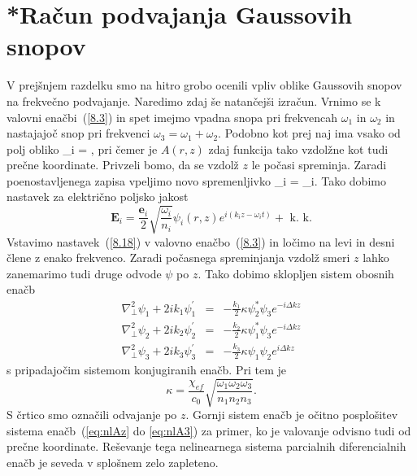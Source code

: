 \section{{*}Račun podvajanja Gaussovih snopov}

V prejšnjem razdelku smo na hitro grobo ocenili vpliv oblike Gaussovih snopov
na frekvečno podvajanje. Naredimo zdaj še natančejši izračun. Vrnimo se k valovni
enačbi~(\ref{8.3}) in spet imejmo vpadna snopa pri frekvencah
$\omega_{1}$ in $\omega_{2}$ in nastajajoč snop pri frekvenci
$\omega_{3}=\omega_{1}+\omega_{2}$.
Podobno kot prej naj ima vsako od polj obliko 
\beq
{}_{i}  = ,
\eeq
pri čemer je $A(r,z)$ zdaj funkcija tako vzdolžne kot tudi prečne koordinate. Privzeli
bomo, da se vzdolž $z$ le počasi spreminja.
Zaradi poenostavljenega zapisa vpeljimo novo spremenljivko 
\beq
\psi_i = _i.
\eeq
Tako dobimo nastavek za električno poljsko jakost
\begin{equation}
\mathbf{E}_{i}=\frac{\mathbf{e}_{i}}{2}\sqrt{\frac{\omega_{i}}{n_{i}}}\psi_{i}(r,z)
e^{i(k_{i}z-\omega_{i}t)}+\mbox{ k. k.}
\label{8.18}
\end{equation}
Vstavimo nastavek~(\ref{8.18}) v valovno
enačbo~(\ref{8.3}) in ločimo na levi in desni člene z enako frekvenco.
Zaradi počasnega spreminjanja vzdolž smeri $z$ lahko zanemarimo tudi druge odvode 
$\psi$ po $z$. Tako dobimo sklopljen sistem obosnih enačb 
\begin{eqnarray}
\nabla_{\perp}^{2}\psi_{1}+2ik_{1}\psi_{1}^{\prime} & = & -
\frac{k_{1}}{2}\kappa\psi_{2}^{\ast}\psi_{3}e^{-i\Delta kz}\\
\nabla_{\perp}^{2}\psi_{2}+2ik_{2}\psi_{2}^{\prime} & = & -
\frac{k_{2}}{2}\kappa\psi_{1}^{\ast}\psi_{3}e^{-i\Delta kz}\\
\nabla_{\perp}^{2}\psi_{3}+2ik_{3}\psi_{3}^{\prime} & =
& - \frac{k_{3}}{2}\kappa\psi_{1}\psi_{2}e^{i\Delta kz}
\label{SHGGauss_3}
\end{eqnarray}
s pripadajočim sistemom konjugiranih enačb. Pri tem je 
\begin{equation}
\kappa=\frac{\chi_{ef}}{c_0} \sqrt{\frac{\omega_{1}\omega_{2}\omega_{3}}{n_{1}n_{2}n_{3}}}.
\label{8.20}
\end{equation}
S črtico smo označili odvajanje po $z$. Gornji sistem enačb je očitno
posplošitev sistema enačb~(\ref{eq:nlAz} do \ref{eq:nlA3}) za primer, ko je valovanje odvisno
tudi od prečne koordinate. Reševanje tega nelinearnega sistema parcialnih
diferencialnih enačb je seveda v splošnem zelo zapleteno.

